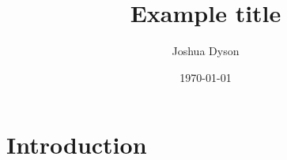 \documentclass[a4paper]{report}
\title{\Huge{Example title}}
\author{\Large{Joshua Dyson}}
\date{\Large{\today}}
\begin{document}
    \maketitle

    

    \newpage

    \chapter{Introduction}
    

    \printbibliography
\end{document}
